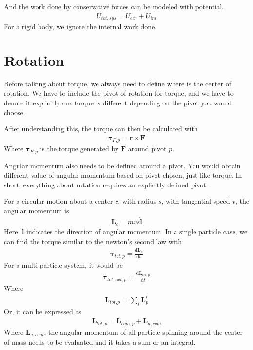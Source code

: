 \documentclass[12pt]{article}
\newcommand{\dydx}[2]{\frac{\text{d} #1}{\text{d} #2}}
\begin{document}
And the work done by conservative forces can be modeled with potential.
\begin{align}
U_{tot,sys} = U_{ext} + U_{int}
\end{align}
For a rigid body, we ignore the internal work done. 

\section{Rotation}

Before talking about torque, we always need to define where is the center of rotation. We have to include the pivot of rotation for torque, and we have to denote it explicitly cuz torque is different depending on the pivot you would choose.

After understanding this, the torque can then be calculated with
\begin{align}
\boldsymbol\tau_{F,p} = \mathbf{r}\times \mathbf{F}
\end{align}
Where $\boldsymbol\tau_{F,p} $ is the torque generated by $\mathbf{F}$ around pivot $p$. 

Angular momentum also needs to be defined around a pivot. You would obtain different value of angular momentum based on pivot chosen, just like torque. In short, everything about rotation requires an explicitly defined pivot.

For a circular motion about a center $c$, with radius $s$, with tangential speed $v$, the angular momentum is
\begin{align}
\mathbf{L}_c = mvs\hat{\mathbf{l}}
\end{align}
Here, $\hat{\mathbf{l}}$ indicates the direction of angular momentum. In a single particle case, we can find the torque similar to the newton's second law with
\begin{align}
\boldsymbol{\tau}_{tot,p} = \dydx{\mathbf{L}_p}{t}
\end{align}
For a multi-particle system, it would be
\begin{align}
\boldsymbol{\tau}_{tot,ext,p} = \dydx{\mathbf{L}_{tot,p}}{t}
\end{align}
Where
\begin{align}
\mathbf{L}_{tot,p} = \sum_i \mathbf{L}^i_p
\end{align}
Or, it can be expressed as
\begin{align}
\mathbf{L}_{tot,p} = \mathbf{L}_{com,p} + \mathbf{L}_{a,com}
\end{align}
Where $\mathbf{L}_{a,com}$, the angular momentum of all particle spinning around the center of mass needs to be evaluated and it takes a sum or an integral. 
\end{document}

